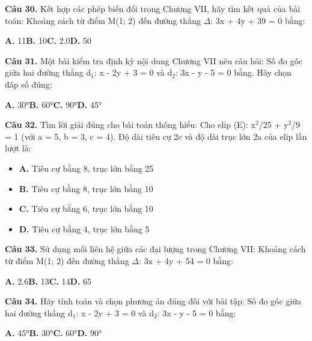 \documentclass[11pt,a4paper]{article}
\begin{document}
\textbf{\color{primary} Câu 30.} Kết hợp các phép biến đổi trong Chương VII, hãy tìm kết quả của bài toán: Khoảng cách từ điểm M(1; 2) đến đường thẳng $\Delta$: 3x + 4y + 39 = 0 bằng:\par
\hspace*{1.5em}\textbf{A.} 11\quad\quad \textbf{B.} 10\quad\quad \textbf{C.} 2.0\quad\quad \textbf{D.} 50\par\vspace{2pt}
\textbf{\color{primary} Câu 31.} Một bài kiểm tra định kỳ nội dung Chương VII nêu câu hỏi: Số đo góc giữa hai đường thẳng d$_1$: x - 2y + 3 = 0 và d$_2$: 3x - y - 5 = 0 bằng. Hãy chọn đáp số đúng:\par
\hspace*{1.5em}\textbf{A.} 30°\quad\quad \textbf{B.} 60°\quad\quad \textbf{C.} 90°\quad\quad \textbf{D.} 45°\par\vspace{2pt}
\textbf{\color{primary} Câu 32.} Tìm lời giải đúng cho bài toán thông hiểu: Cho elip (E): x$^2$/25 + y$^2$/9 = 1 (với a = 5, b = 3, c = 4). Độ dài tiêu cự 2c và độ dài trục lớn 2a của elip lần lượt là:\par
\begin{itemize}\setlength{\itemsep}{1pt}\setlength{\parskip}{0pt}
  \item[] \textbf{A.} Tiêu cự bằng 8, trục lớn bằng 25
  \item[] \textbf{B.} Tiêu cự bằng 8, trục lớn bằng 10
  \item[] \textbf{C.} Tiêu cự bằng 6, trục lớn bằng 10
  \item[] \textbf{D.} Tiêu cự bằng 4, trục lớn bằng 5
\end{itemize}\vspace{2pt}
\textbf{\color{primary} Câu 33.} Sử dụng mối liên hệ giữa các đại lượng trong Chương VII: Khoảng cách từ điểm M(1; 2) đến đường thẳng $\Delta$: 3x + 4y + 54 = 0 bằng:\par
\hspace*{1.5em}\textbf{A.} 2.6\quad\quad \textbf{B.} 13\quad\quad \textbf{C.} 14\quad\quad \textbf{D.} 65\par\vspace{2pt}
\textbf{\color{primary} Câu 34.} Hãy tính toán và chọn phương án đúng đối với bài tập: Số đo góc giữa hai đường thẳng d$_1$: x - 2y + 3 = 0 và d$_2$: 3x - y - 5 = 0 bằng:\par
\hspace*{1.5em}\textbf{A.} 45°\quad\quad \textbf{B.} 30°\quad\quad \textbf{C.} 60°\quad\quad \textbf{D.} 90°\par\vspace{2pt}
\end{document}
